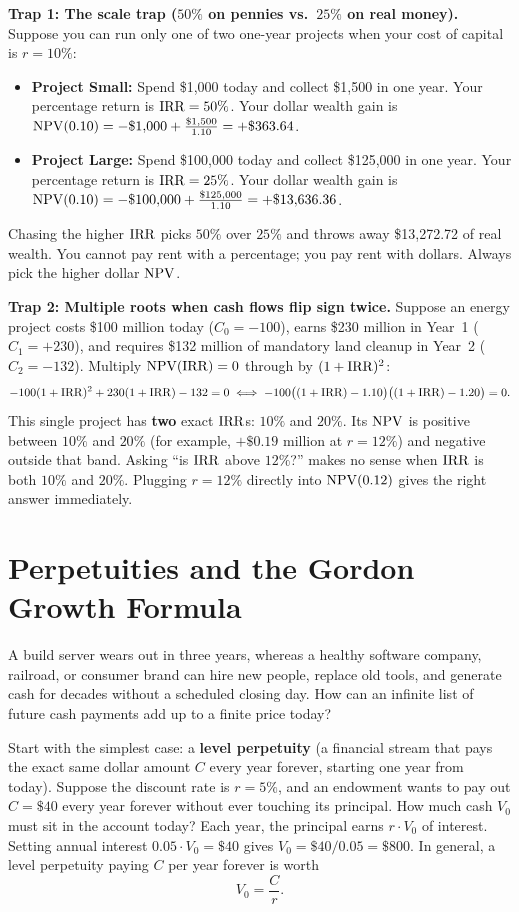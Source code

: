 \begin{trapbox}
\textbf{Trap 1: The scale trap ($50\%$ on pennies vs.\ $25\%$ on real money).}
Suppose you can run only one of two one-year projects when your cost of capital is $r = 10\%$:
\begin{itemize}
 \item \textbf{Project Small:} Spend \$1,000 today and collect \$1,500 in one year. Your percentage return is $\operatorname{IRR} = 50\%$. Your dollar wealth gain is $\operatorname{NPV}(0.10) = -\$1{,}000 + \frac{\$1{,}500}{1.10} = +\$363.64$.
 \item \textbf{Project Large:} Spend \$100,000 today and collect \$125,000 in one year. Your percentage return is $\operatorname{IRR} = 25\%$. Your dollar wealth gain is $\operatorname{NPV}(0.10) = -\$100{,}000 + \frac{\$125{,}000}{1.10} = +\$13{,}636.36$.
\end{itemize}
Chasing the higher $\operatorname{IRR}$ picks $50\%$ over $25\%$ and throws away \$13,272.72 of real wealth. You cannot pay rent with a percentage; you pay rent with dollars. Always pick the higher dollar $\operatorname{NPV}$.

\medskip
\textbf{Trap 2: Multiple roots when cash flows flip sign twice.}
Suppose an energy project costs \$100 million today ($C_0 = -100$), earns \$230 million in Year~1 ($C_1 = +230$), and requires \$132 million of mandatory land cleanup in Year~2 ($C_2 = -132$). Multiply $\operatorname{NPV}(\operatorname{IRR}) = 0$ through by $(1+\operatorname{IRR})^2$:
\[
 -100(1+\operatorname{IRR})^2 + 230(1+\operatorname{IRR}) - 132 = 0 \iff -100\bigl((1+\operatorname{IRR}) - 1.10\bigr)\bigl((1+\operatorname{IRR}) - 1.20\bigr) = 0.
\]
This single project has \textbf{two} exact $\operatorname{IRR}$s: $10\%$ and $20\%$. Its $\operatorname{NPV}$ is positive between $10\%$ and $20\%$ (for example, $+\$0.19$ million at $r = 12\%$) and negative outside that band. Asking ``is $\operatorname{IRR}$ above $12\%$?'' makes no sense when $\operatorname{IRR}$ is both $10\%$ and $20\%$. Plugging $r = 12\%$ directly into $\operatorname{NPV}(0.12)$ gives the right answer immediately.
\end{trapbox}

\section{Perpetuities and the Gordon Growth Formula}

A build server wears out in three years, whereas a healthy software company, railroad, or consumer brand can hire new people, replace old tools, and generate cash for decades without a scheduled closing day. How can an infinite list of future cash payments add up to a finite price today?

Start with the simplest case: a \textbf{level perpetuity} (a financial stream that pays the exact same dollar amount $C$ every year forever, starting one year from today). Suppose the discount rate is $r = 5\%$, and an endowment wants to pay out $C = \$40$ every year forever without ever touching its principal. How much cash $V_0$ must sit in the account today? Each year, the principal earns $r \cdot V_0$ of interest. Setting annual interest $0.05 \cdot V_0 = \$40$ gives $V_0 = \$40 / 0.05 = \$800$. In general, a level perpetuity paying $C$ per year forever is worth
\[
 V_0 = \frac{C}{r}.
\]


